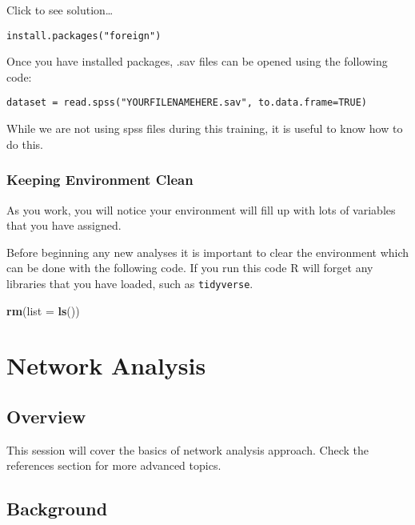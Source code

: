 \documentclass[]{book}
\newenvironment{Shaded}{\begin{snugshade}}{\end{snugshade}}
\newcommand{\DataTypeTok}[1]{\textcolor[rgb]{0.13,0.29,0.53}{#1}}
\newcommand{\KeywordTok}[1]{\textcolor[rgb]{0.13,0.29,0.53}{\textbf{#1}}}
\newcommand{\NormalTok}[1]{#1}
\begin{document}
Click to see solution\ldots{}

\begin{verbatim}
install.packages("foreign")
\end{verbatim}

Once you have installed packages, .sav files can be opened using the following code:

\texttt{dataset\ =\ read.spss("YOURFILENAMEHERE.sav",\ to.data.frame=TRUE)}

While we are not using spss files during this training, it is useful to know how to do this.

\hypertarget{keeping-environment-clean}{%
\subsection{Keeping Environment Clean}\label{keeping-environment-clean}}

As you work, you will notice your environment will fill up with lots of variables that you have assigned.

Before beginning any new analyses it is important to clear the environment which can be done with the following code. If you run this code R will forget any libraries that you have loaded, such as \texttt{tidyverse}.

\begin{Shaded}
\begin{Highlighting}[]
\KeywordTok{rm}\NormalTok{(}\DataTypeTok{list =} \KeywordTok{ls}\NormalTok{())}
\end{Highlighting}
\end{Shaded}

\hypertarget{network-analysis}{%
\chapter{Network Analysis}\label{network-analysis}}

\hypertarget{overview-3}{%
\section{Overview}\label{overview-3}}

This session will cover the basics of network analysis approach. Check the references section for more advanced topics.

\hypertarget{background}{%
\section{Background}\label{background}}
\end{document}
